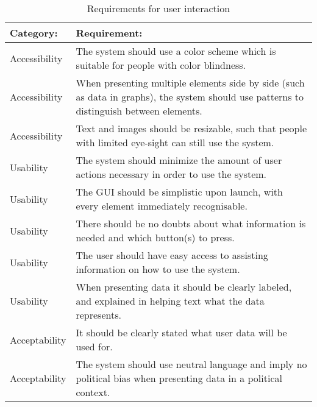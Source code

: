 \begin{table}[H]\centering
\begin{tabular}{|l|p{11cm}|}\hline
\textbf{Category:} & \textbf{Requirement:} \\\hline 
Accessibility  & The system should use a color scheme which is suitable for
people with color blindness.\\\hline 
Accessibility  & When presenting multiple elements side by side (such as data
in graphs), the system should use patterns to distinguish between
elements.\\\hline
Accessibility & Text and images should be resizable, such that people with
limited eye-sight can still use the system.\\\hline
Usability & The system should minimize the amount of user actions necessary in
order to use the system. \\\hline
Usability & The \ac{GUI} should be simplistic upon launch, with every element
immediately recognisable. \\\hline
Usability & There should be no doubts about what information is needed and which
button(s) to press. \\\hline
Usability & The user should have easy access to assisting information on how to
use the system. \\\hline
Usability & When presenting data it should be clearly labeled, and explained in
helping text what the data represents.\\\hline
Acceptability & It should be clearly stated what user data will be used for.\\\hline
Acceptability & The system should use neutral language and imply no political
bias when presenting data in a political context.\\\hline
\end{tabular}
\caption{Requirements for user interaction}
\label{tab:userReq}
\end{table}